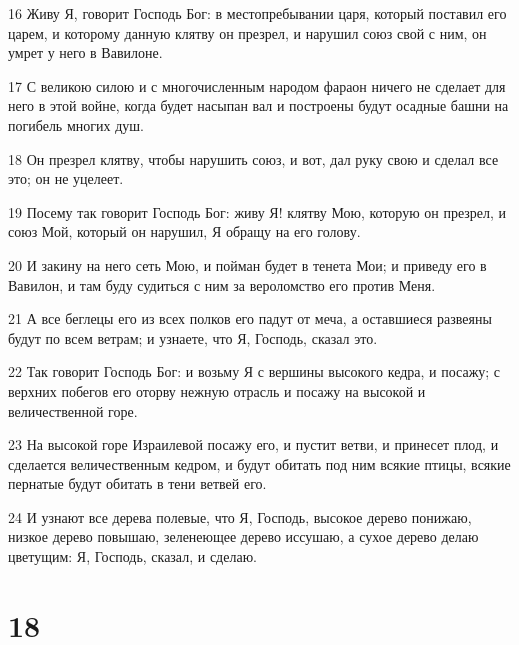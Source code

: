 \par 16 Живу Я, говорит Господь Бог: в местопребывании царя, который поставил его царем, и которому данную клятву он презрел, и нарушил союз свой с ним, он умрет у него в Вавилоне.
\par 17 С великою силою и с многочисленным народом фараон ничего не сделает для него в этой войне, когда будет насыпан вал и построены будут осадные башни на погибель многих душ.
\par 18 Он презрел клятву, чтобы нарушить союз, и вот, дал руку свою и сделал все это; он не уцелеет.
\par 19 Посему так говорит Господь Бог: живу Я! клятву Мою, которую он презрел, и союз Мой, который он нарушил, Я обращу на его голову.
\par 20 И закину на него сеть Мою, и пойман будет в тенета Мои; и приведу его в Вавилон, и там буду судиться с ним за вероломство его против Меня.
\par 21 А все беглецы его из всех полков его падут от меча, а оставшиеся развеяны будут по всем ветрам; и узнаете, что Я, Господь, сказал это.
\par 22 Так говорит Господь Бог: и возьму Я с вершины высокого кедра, и посажу; с верхних побегов его оторву нежную отрасль и посажу на высокой и величественной горе.
\par 23 На высокой горе Израилевой посажу его, и пустит ветви, и принесет плод, и сделается величественным кедром, и будут обитать под ним всякие птицы, всякие пернатые будут обитать в тени ветвей его.
\par 24 И узнают все дерева полевые, что Я, Господь, высокое дерево понижаю, низкое дерево повышаю, зеленеющее дерево иссушаю, а сухое дерево делаю цветущим: Я, Господь, сказал, и сделаю.

\chapter{18}


